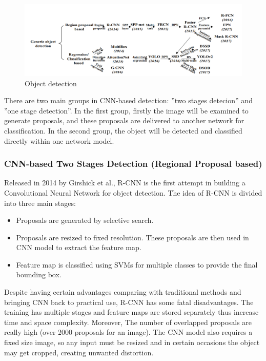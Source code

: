 \begin{figure}[!t]
\centering
\includegraphics[width=14cm]{Images/recognition/Object_Detection.png}
\caption{Object detection}
\label{fig:object detection}
\end{figure}

There are two main groups in CNN-based detection: ''two stages detecion'' and ''one stage detection''. In the first group, firstly the image will be examined to generate proposals, and these proposals are delivered to another network for classification. In the second group, the object will be detected and classified directly within one network model.

\subsubsection{CNN-based Two Stages Detection (Regional Proposal based)}
Released in 2014 by Girshick et al.\cite{17,18}, R-CNN is the first attempt in building a Convolutional Neural Network for object detection. The idea of R-CNN is divided into three main stages:
\begin{itemize}
    \item Proposals are generated by selective search.
    \item Proposals are resized to fixed resolution. These proposals are then used in CNN model to extract the feature map.
    \item Feature map is classified using SVMs for multiple classes to provide the final bounding box.
\end{itemize}
Despite having certain advantages comparing with traditional methods and bringing CNN back to practical use, R-CNN has some fatal disadvantages. The training has multiple stages and feature maps are stored separately thus increase time and space complexity. Moreover, The number of overlapped proposals are really high (over 2000 proposals for an image). The CNN model also requires a fixed size image, so any input must be resized and in certain occasions the object may get cropped, creating unwanted distortion.
    

